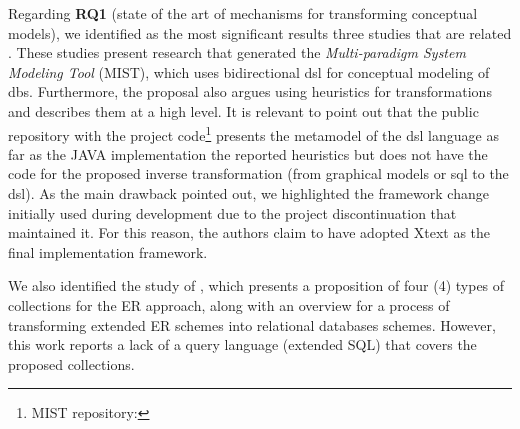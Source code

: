 Regarding \textbf{RQ1} (state of the art of mechanisms for transforming conceptual models), we identified as the most significant results three studies that are related \cite{Ristic:2016, Dimitrieski:2015, Dimitrieski:2014}.
These studies present research that generated the \textit{Multi-paradigm System Modeling Tool} (MIST), which uses bidirectional \ac{dsl} for conceptual modeling of \acp{db}.
Furthermore, the proposal also argues using heuristics for transformations and describes them at a high level.
It is relevant to point out that the public repository with the project code\footnote{MIST repository: } presents the metamodel of the \ac{dsl} language as far as the JAVA implementation the reported heuristics but does not have the code for the proposed inverse transformation (from graphical models or \ac{sql} to the \ac{dsl}).
As the main drawback pointed out, we highlighted the framework change initially used during development due to the project discontinuation that maintained it.
For this reason, the authors claim to have adopted Xtext as the final implementation framework.

We also identified the study of \cite{Hartmann:2007}, which presents a proposition of four (4) types of collections for the ER approach, along with an overview for a process of
transforming extended ER schemes into relational databases schemes.
However, this work reports a lack of a query language (extended SQL) that covers the proposed collections.

